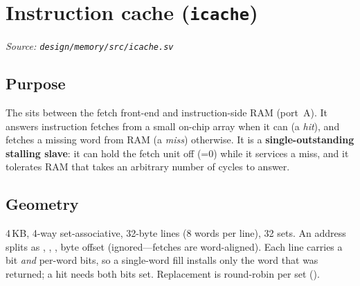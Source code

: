 \section{Instruction cache (\texttt{icache})}
\textit{Source: \texttt{design/memory/src/icache.sv}}

\subsection{Purpose}
The  sits between the fetch front-end and instruction-side RAM
(port~A). It answers instruction fetches from a small on-chip array when it can
(a \emph{hit}), and fetches a missing word from RAM (a \emph{miss}) otherwise.
It is a \textbf{single-outstanding stalling slave}: it can hold the fetch unit
off (=0) while it services a miss, and it tolerates RAM that
takes an arbitrary number of cycles to answer.


\subsection{Geometry}
4\,KB, 4-way set-associative, 32-byte lines (8 words per line), 32 sets. An
address splits as , , , byte
offset \sig{[1:0]} (ignored---fetches are word-aligned). Each line carries a
 bit \emph{and} per-word  bits, so a single-word
fill installs only the word that was returned; a hit needs both bits set.
Replacement is round-robin per set ().

